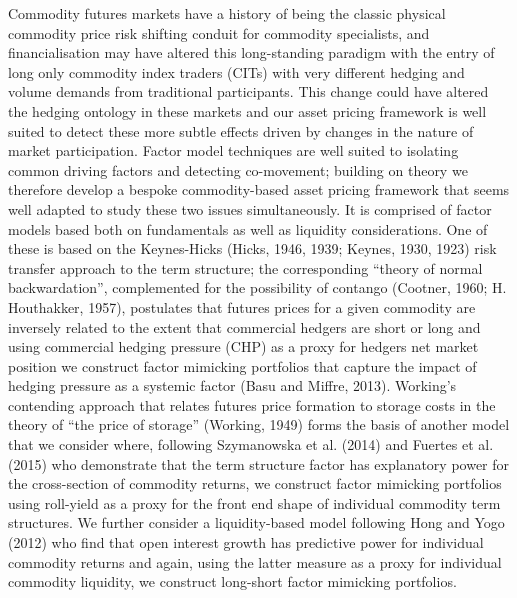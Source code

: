 \documentclass[]{elsarticle} %
\begin{document}
Commodity futures markets have a history of being the classic physical commodity price risk shifting conduit for commodity specialists, and financialisation may have altered this long-standing paradigm with the entry of long only commodity index traders (CITs) with very different hedging and volume demands from traditional participants. This change could have altered the hedging ontology in these markets and our asset pricing framework is well suited to detect these more subtle effects driven by changes in the nature of market participation. Factor model techniques are well suited to isolating common driving factors and detecting co-movement; building on theory we therefore develop a bespoke commodity-based asset pricing framework that seems well adapted to study these two issues simultaneously. It is comprised of factor models based both on fundamentals as well as liquidity considerations. One of these is based on the Keynes-Hicks (Hicks, 1946, 1939; Keynes, 1930, 1923) risk transfer approach to the term structure; the corresponding ``theory of normal backwardation'', complemented for the possibility of contango (Cootner, 1960; H. Houthakker, 1957), postulates that futures prices for a given commodity are inversely related to the extent that commercial hedgers are short or long and using commercial hedging pressure (CHP) as a proxy for hedgers net market position we construct factor mimicking portfolios that capture the impact of hedging pressure as a systemic factor (Basu and Miffre, 2013). Working's contending approach that relates futures price formation to storage costs in the theory of ``the price of storage'' (Working, 1949) forms the basis of another model that we consider where, following Szymanowska et al. (2014) and Fuertes et al. (2015) who demonstrate that the term structure factor has explanatory power for the cross-section of commodity returns, we construct factor mimicking portfolios using roll-yield as a proxy for the front end shape of individual commodity term structures. We further consider a liquidity-based model following Hong and Yogo (2012) who find that open interest growth has predictive power for individual commodity returns and again, using the latter measure as a proxy for individual commodity liquidity, we construct long-short factor mimicking portfolios.

\bigskip
\setlength{\parindent}{0pt}
\end{document}
